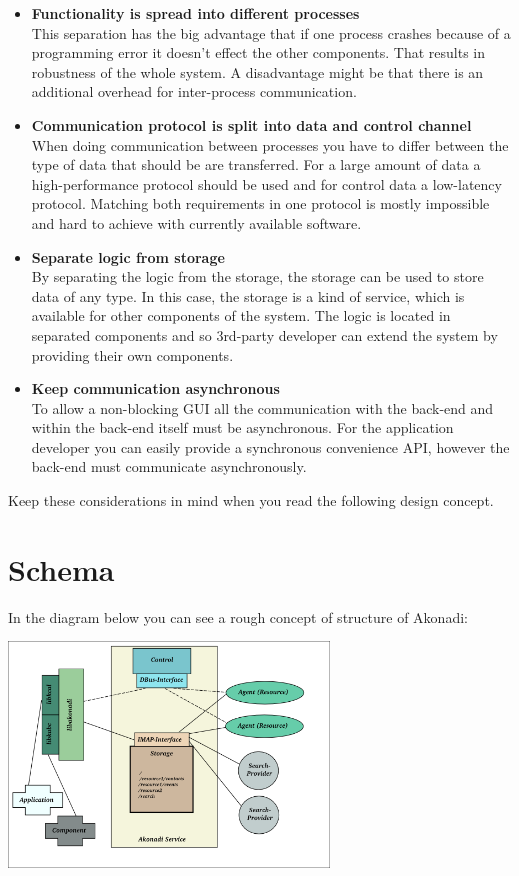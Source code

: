 \documentclass[]{report}
\begin{document}
\begin{itemize}
  \item \textbf{Functionality is spread into different processes}\\
        This separation has the big advantage that if one process crashes because of
        a programming error it doesn't effect the other components. That results in
        robustness of the whole system. A disadvantage might be that there is an additional
        overhead for inter-process communication.
  \item \textbf{Communication protocol is split into data and control channel}\\
        When doing communication between processes you have to differ between the type of data
        that should be are transferred. For a large amount of data a high-performance
        protocol should be used and for control data a low-latency protocol.
        Matching both requirements in one protocol is mostly impossible and hard to
        achieve with currently available software.
  \item \textbf{Separate logic from storage}\\
        By separating the logic from the storage, the storage can be used to store data
        of any type. In this case, the storage is a kind of service, which is available for
        other components of the system. The logic is located in separated components and so
        3rd-party developer can extend the system by providing their own components.
  \item \textbf{Keep communication asynchronous}\\
        To allow a non-blocking GUI all the communication with the back-end and within the
        back-end itself must be asynchronous. For the application developer you can easily
        provide a synchronous convenience API, however the back-end must communicate asynchronously.
\end{itemize}

Keep these considerations in mind when you read the following design concept.

\section{Schema}

In the diagram below you can see a rough concept of structure of Akonadi:

\begin{center}
\includegraphics[height=6cm]{pics/concept.png}
\end{center}
\end{document}

